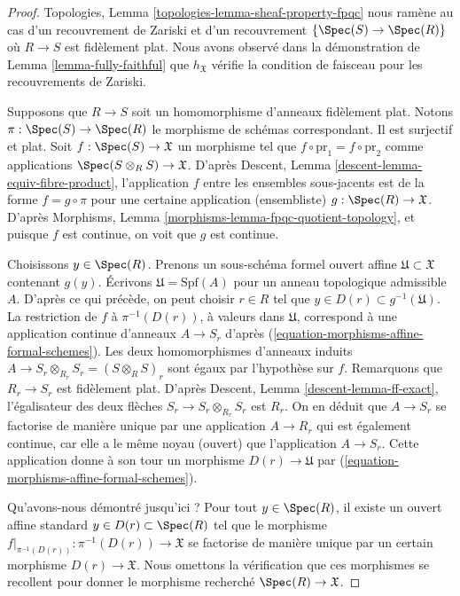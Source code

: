 \begin{proof}
Topologies, Lemma \ref{topologies-lemma-sheaf-property-fpqc}
nous ramène au cas d'un recouvrement de Zariski et d'un recouvrement
$\{\Spec(S) \to \Spec(R)\}$ où $R \to S$ est fidèlement plat.
Nous avons observé dans la démonstration de Lemma \ref{lemma-fully-faithful} 
que $h_\mathfrak X$ vérifie la condition de faisceau pour les recouvrements de Zariski.

\medskip\noindent
Supposons que $R \to S$ soit un homomorphisme d'anneaux fidèlement plat.
Notons $\pi : \Spec(S) \to \Spec(R)$ le
morphisme de schémas correspondant. Il est surjectif et plat.
Soit $f : \Spec(S) \to \mathfrak X$ un morphisme
tel que $f \circ \text{pr}_1 = f \circ \text{pr}_2$
comme applications $\Spec(S \otimes_R S) \to \mathfrak X$.
D'après Descent, Lemma \ref{descent-lemma-equiv-fibre-product},
l'application $f$ entre les ensembles sous-jacents
est de la forme $f = g \circ \pi$ pour une certaine
application (ensembliste) $g : \Spec(R) \to \mathfrak X$.
D'après Morphisms, Lemma \ref{morphisms-lemma-fpqc-quotient-topology},
et puisque $f$ est continue, on voit que $g$
est continue.

\medskip\noindent
Choisissons $y \in \Spec(R)$. Prenons un sous-schéma formel ouvert affine
$\mathfrak U \subset \mathfrak X$ contenant $g(y)$.
Écrivons $\mathfrak U = \text{Spf}(A)$ pour un anneau topologique
admissible $A$. D'après ce qui précède, on peut choisir $r \in R$ tel que
$y \in D(r) \subset g^{-1}(\mathfrak U)$.
La restriction de $f$ à $\pi^{-1}(D(r))$, à valeurs dans $\mathfrak U$,
correspond à une application continue d'anneaux $A \to S_r$ d'après
(\ref{equation-morphisms-affine-formal-schemes}). Les deux homomorphismes d'anneaux induits
$A \to S_r \otimes_{R_r} S_r = (S \otimes_R S)_r$ sont égaux
par l'hypothèse sur $f$.
Remarquons que $R_r \to S_r$ est fidèlement plat.
D'après Descent, Lemma \ref{descent-lemma-ff-exact}, l'égalisateur des
deux flèches $S_r \to S_r \otimes_{R_r} S_r$ est $R_r$.
On en déduit que $A \to S_r$ se factorise de manière unique par une application $A \to R_r$
qui est également continue, car elle a le même noyau (ouvert) que
l'application $A \to S_r$. Cette application donne à son tour un morphisme $D(r) \to \mathfrak U$ par
(\ref{equation-morphisms-affine-formal-schemes}).

\medskip\noindent
Qu'avons-nous démontré jusqu'ici ? Pour tout $y \in \Spec(R)$,
il existe un ouvert affine standard
$y \in D(r) \subset \Spec(R)$ tel que le morphisme
$f|_{\pi^{-1}(D(r))} : \pi^{-1}(D(r)) \to \mathfrak X$ se factorise de manière unique
par un certain morphisme $D(r) \to \mathfrak X$. Nous omettons la
vérification que ces morphismes se recollent pour donner le
morphisme recherché $\Spec(R) \to \mathfrak X$.
\end{proof}

